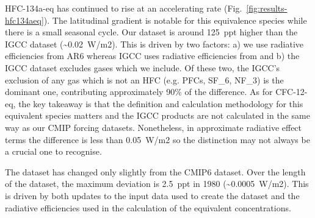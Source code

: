 HFC-134a-eq has continued to rise at an accelerating rate (Fig.~\ref{fig:results-hfc134aeq}).
The latitudinal gradient is notable for this equivalence species while there is a small seasonal cycle.
Our dataset is around 125~ppt higher than the IGCC dataset (\textasciitilde{}0.02~W/m2).
This is driven by two factors: a) we use radiative efficiencies from AR6 \citep{IPCC_AR6-WG1-Ch-7-SM_2021}
whereas IGCC uses radiative efficiencies from \citet{hodnebrog_gwps-efficiencies_2020}
and b) the IGCC dataset excludes gases which we include.
Of these two, the IGCC's exclusion of any gas which is not an HFC
(e.g. PFCs, SF_6, NF_3) is the dominant one,
contributing approximately 90\% of the difference.
As for CFC-12-eq, the key takeaway is that
the definition and calculation methodology for this equivalent species matters
and the IGCC products are not calculated in the same way as our CMIP forcing datasets.
Nonetheless, in approximate radiative effect terms the difference is less than 0.05~W/m2
so the distinction may not always be a crucial one to recognise.

The dataset has changed only slightly from the CMIP6 dataset.
Over the length of the dataset, the maximum deviation is 2.5~ppt in 1980 (\textasciitilde{}0.0005~W/m2).
This is driven by both updates to the input data used to create the dataset
and the radiative efficiencies used in the calculation of the equivalent concentrations.

